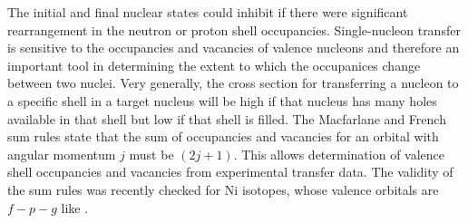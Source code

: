 The initial and final nuclear states could inhibit \zvbb if there were significant rearrangement in the neutron or proton shell occupancies.  Single-nucleon transfer is sensitive to the occupancies and vacancies of valence nucleons and therefore an important tool in determining the extent to which the occupanices change between two nuclei.  Very generally, the cross section for transferring a nucleon to a specific shell in a target nucleus will be high if that nucleus has many holes available in that shell but low if that shell is filled.  The Macfarlane and French \citep{sumRules} sum rules state that the sum of occupancies and vacancies for an orbital with angular momentum $j$ must be $(2j+1)$.  This allows determination of valence shell occupancies and vacancies from experimental transfer data.  The validity of the sum rules was recently checked \cite{SumRuleCheck} for Ni isotopes, whose valence orbitals are $f-p-g$ like \GeTargets.  

